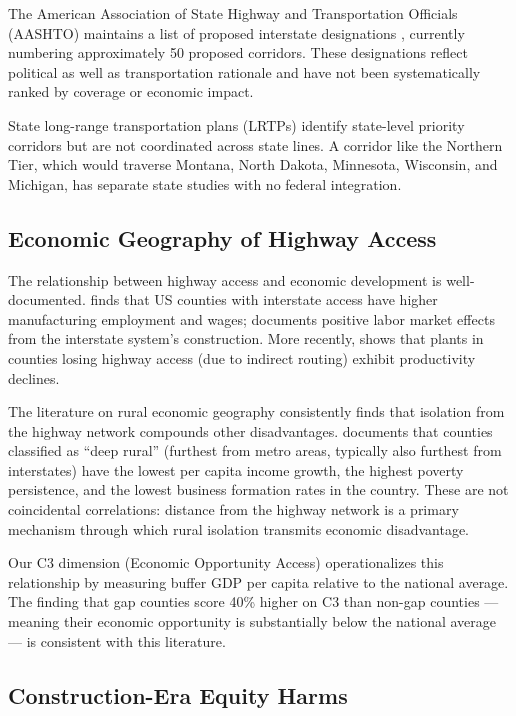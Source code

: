 The American Association of State Highway and Transportation Officials (AASHTO) maintains a list of proposed interstate designations \citep{AASHTO2023}, currently numbering approximately 50 proposed corridors. These designations reflect political as well as transportation rationale and have not been systematically ranked by coverage or economic impact.

State long-range transportation plans (LRTPs) identify state-level priority corridors but are not coordinated across state lines. A corridor like the Northern Tier, which would traverse Montana, North Dakota, Minnesota, Wisconsin, and Michigan, has separate state studies with no federal integration.

\subsection{Economic Geography of Highway Access}

The relationship between highway access and economic development is well-documented. \citet{Michaels2008} finds that US counties with interstate access have higher manufacturing employment and wages; \citet{Chandra2000} documents positive labor market effects from the interstate system's construction. More recently, \citet{Giroud2013} shows that plants in counties losing highway access (due to indirect routing) exhibit productivity declines.

The literature on rural economic geography consistently finds that isolation from the highway network compounds other disadvantages. \citet{USDA_ERS2020} documents that counties classified as ``deep rural'' (furthest from metro areas, typically also furthest from interstates) have the lowest per capita income growth, the highest poverty persistence, and the lowest business formation rates in the country. These are not coincidental correlations: distance from the highway network is a primary mechanism through which rural isolation transmits economic disadvantage.

Our C3 dimension (Economic Opportunity Access) operationalizes this relationship by measuring buffer GDP per capita relative to the national average. The finding that gap counties score 40\% higher on C3 than non-gap counties --- meaning their economic opportunity is substantially below the national average --- is consistent with this literature.

\subsection{Construction-Era Equity Harms}

